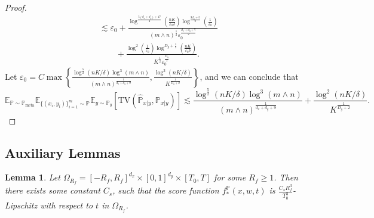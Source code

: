 \documentclass{article}
\numberwithin{equation}{section}
\newcommand{\E}{\mathbb{E}}
\newtheorem{lemma}[thm]{Lemma}
\theoremstyle{definition}
\newcommand{\Pmeta}{\mathbb{P}_{\text{meta}}}
\renewcommand{\P}{\mathbb{P}}
\begin{document}
\begin{proof}
\begin{equation}
\begin{aligned}
            &\lesssim \varepsilon_0+\frac{\log^{\frac{5(d_x+d_y)+17}{4}}(\frac{nK}{\varepsilon_0\delta})
            \log^{\frac{3d_x+5}{2}}(\frac{1}{\varepsilon_0})}{(m\wedge n)^{\frac{1}{2}}\varepsilon_0^{\frac{d_x+d_y+7}{2}}} \\
            &\qquad + \frac{\log^2(\frac{1}{\varepsilon_0})\log^{D_y+\frac{1}{2}}(\frac{nK}{\varepsilon_0\delta})}{K^{\frac{1}{2}}\varepsilon_0^{\frac{D_y}{2}}}.
        \end{aligned}
    \end{equation}
    Let $\varepsilon_0=C\max\left\{\frac{\log^{\frac{5}{2}}(nK/\delta)\log^3(m\wedge n)}{(m\wedge n)^{\frac{1}{d_x+d_y+9}}},\frac{\log^2(nK/\delta)}{K^{\frac{1}{D_y+2}}}\right\}$, and we can conclude that
    \begin{equation}
        \E_{\P\sim\Pmeta}\E_{\{(x_i,y_i)\}_{i=1}^m\sim \P}\E_{y\sim\P_y} [\mathrm{TV}(\widehat{\P}_{x|y},\P_{x|y})]
        \lesssim \frac{\log^{\frac{5}{2}}(nK/\delta)\log^3(m\wedge n)}{(m\wedge n)^{\frac{1}{d_x+d_y+9}}}+\frac{\log^2(nK/\delta)}{K^{\frac{1}{D_y+2}}}.
    \end{equation}
\end{proof}


\subsection{Auxiliary Lemmas}

\begin{lemma}\label{lem:lip_t}
    Let $\Omega_{R_f}=[-R_f,R_f]^{d_x}\times[0,1]^{d_y}\times[T_0,T]$ for some $R_f\geq 1$. Then there exists some constant $C_s$, such that the score function $f_*^\P(x,w,t)$ is $\frac{C_sR_f^3}{T_0^3}$-Lipschitz with respect to $t$ in $\Omega_{R_f}$.
\end{lemma}
\end{document}
